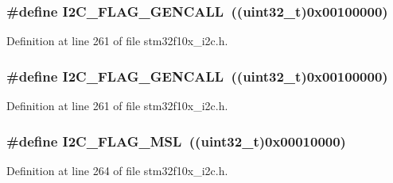 \subsubsection[{\texorpdfstring{I2\+C\+\_\+\+F\+L\+A\+G\+\_\+\+G\+E\+N\+C\+A\+LL}{I2C_FLAG_GENCALL}}]{\setlength{\rightskip}{0pt plus 5cm}\#define I2\+C\+\_\+\+F\+L\+A\+G\+\_\+\+G\+E\+N\+C\+A\+LL~(({\bf uint32\+\_\+t})0x00100000)}\hypertarget{group___i2_c__flags__definition_gab3a93b6840ad406c2fc09e0e96c59b88}{}\label{group___i2_c__flags__definition_gab3a93b6840ad406c2fc09e0e96c59b88}


Definition at line 261 of file stm32f10x\+\_\+i2c.\+h.

\subsubsection[{\texorpdfstring{I2\+C\+\_\+\+F\+L\+A\+G\+\_\+\+G\+E\+N\+C\+A\+LL}{I2C_FLAG_GENCALL}}]{\setlength{\rightskip}{0pt plus 5cm}\#define I2\+C\+\_\+\+F\+L\+A\+G\+\_\+\+G\+E\+N\+C\+A\+LL~(({\bf uint32\+\_\+t})0x00100000)}\hypertarget{group___i2_c__flags__definition_gab3a93b6840ad406c2fc09e0e96c59b88}{}\label{group___i2_c__flags__definition_gab3a93b6840ad406c2fc09e0e96c59b88}


Definition at line 261 of file stm32f10x\+\_\+i2c.\+h.

\subsubsection[{\texorpdfstring{I2\+C\+\_\+\+F\+L\+A\+G\+\_\+\+M\+SL}{I2C_FLAG_MSL}}]{\setlength{\rightskip}{0pt plus 5cm}\#define I2\+C\+\_\+\+F\+L\+A\+G\+\_\+\+M\+SL~(({\bf uint32\+\_\+t})0x00010000)}\hypertarget{group___i2_c__flags__definition_gae8e6a404cbfd70420d278d520304f368}{}\label{group___i2_c__flags__definition_gae8e6a404cbfd70420d278d520304f368}


Definition at line 264 of file stm32f10x\+\_\+i2c.\+h.

